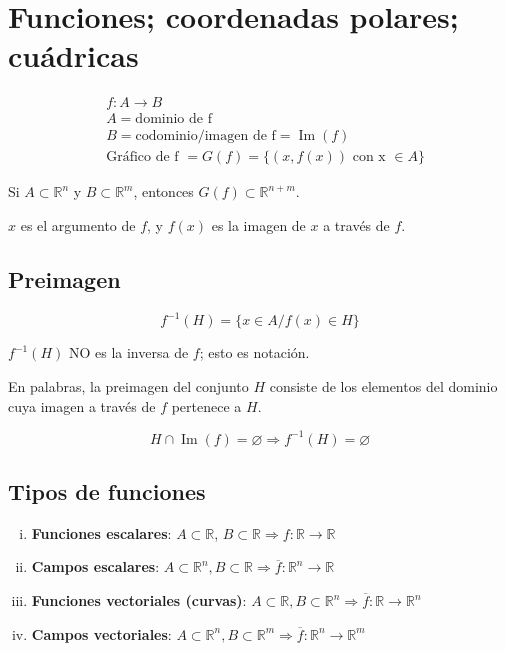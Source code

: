 \documentclass{article}
\renewcommand{\Bbb}{\mathbb}
\begin{document}
\section{Funciones; coordenadas polares; cuádricas}

\begin{subequations}
\begin{align}
&f: A \rightarrow B \\
&A = \text{dominio de f} \\
&B = \text{codominio/imagen de f} = \mathop{Im}(f) \\
&\text{Gráfico de f } = G(f) = \{ (x, f(x)) \text{ con x } \in A \}
\end{align}
\end{subequations}

Si $A \subset \Bbb R^n$ y $B \subset \Bbb R^m$, entonces $G(f) \subset \Bbb R^{n+m}$.

$x$ es el argumento de $f$, y $f(x)$ es la imagen de $x$ a través de $f$.

\subsection{Preimagen}

\begin{equation}
f^{-1}(H) = \{ x \in A / f(x) \in H \}
\end{equation}

$f^{-1}(H)$ NO es la inversa de $f$; esto es notación.

En palabras, la preimagen del conjunto $H$ consiste de los elementos del dominio cuya imagen a través de $f$ pertenece a $H$.

\begin{equation}
H \cap \mathop{Im}(f) = \varnothing \Longrightarrow f^{-1}(H) = \varnothing
\end{equation}

\subsection{Tipos de funciones}

\begin{enumerate}[i)]
\item \textbf{Funciones escalares}: $A \subset \Bbb R$, $B \subset \Bbb R \Longrightarrow f: \Bbb R \rightarrow \Bbb R$

\item \textbf{Campos escalares}: $A \subset \Bbb R^n, B \subset \Bbb R \Longrightarrow \overline{f}: \Bbb R^n \rightarrow \Bbb R$

\item \textbf{Funciones vectoriales (curvas)}: $A \subset \Bbb R, B \subset \Bbb R^n \Longrightarrow \overline{f}: \Bbb R \rightarrow \Bbb R^n$

\item \textbf{Campos vectoriales}: $A \subset \Bbb R^n, B \subset \Bbb R^m \Longrightarrow \overline{f}: \Bbb R^n \rightarrow \Bbb R^m$
\end{enumerate}
\end{document}

